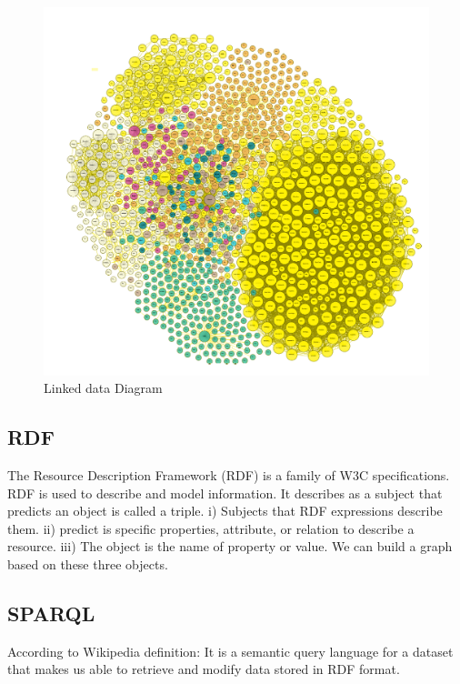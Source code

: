 \begin{center}
	\begin{figure}[htb!]
		
		\begin{minipage}{0.55\linewidth}
			\centering
			\includegraphics[width=1.55\textwidth]{images/chap02_LinkData.png}
		\end{minipage}
		\caption[Linked data diagram]{Linked data Diagram\cite{Hector}}
		
		
	\end{figure}
	
\end{center}
\subsection{RDF}
The Resource Description Framework (RDF) is a family
of W3C specifications. RDF is used to describe and model information. It describes as a subject that predicts an object is called a triple.
i) Subjects that RDF expressions describe them.
ii) predict is specific properties, attribute, or relation to describe a resource.
iii) The object is the name of property or value.
We can build a graph based on these three objects.

\subsection{SPARQL}
According to Wikipedia definition: It is a semantic query language for a dataset that makes us able to retrieve and modify data stored in RDF format.    

